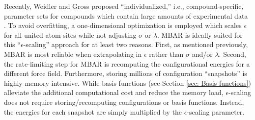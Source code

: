 \documentclass[journal=jced,manuscript=article]{achemso}
\begin{document}
Recently, Weidler and Gross proposed ``individualized,'' i.e., compound-specific, parameter sets for compounds which contain large amounts of experimental data \cite{Weidler2018}. To avoid overfitting, a one-dimensional optimization is employed which scales $\epsilon$ for all united-atom sites while not adjusting $\sigma$ or $\lambda$. MBAR is ideally suited for this ``$\epsilon$-scaling'' approach for at least two reasons. First, as mentioned previously, MBAR is most reliable when extrapolating in $\epsilon$ rather than $\sigma$ and/or $\lambda$. Second, the rate-limiting step for MBAR is recomputing the configurational energies for a different force field. Furthermore, storing millions of configuration ``snapshots'' is highly memory intensive. While basis functions (see Section \ref{sec: Basis functions}) alleviate the additional computational cost and reduce the memory load, $\epsilon$-scaling does not require storing/recomputing configurations or basis functions. Instead, the energies for each snapshot are simply multiplied by the $\epsilon$-scaling parameter.  



\end{document}
